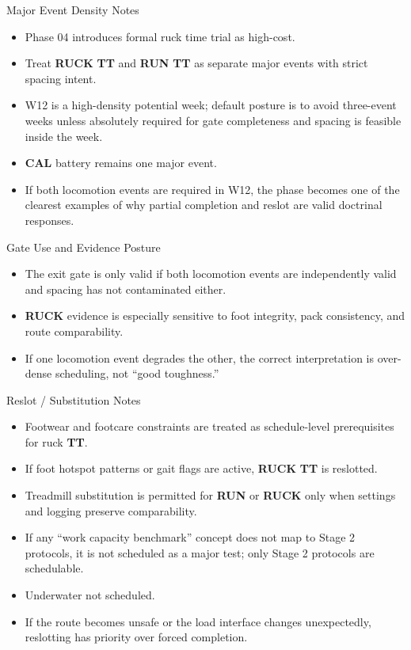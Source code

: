 \documentclass[10pt]{article}
\begin{document}
Major Event Density Notes

\begin{itemize}
\item Phase 04 introduces formal ruck time trial as high-cost.
\item Treat \textbf{RUCK} \textbf{TT} and \textbf{RUN} \textbf{TT} as separate major events with strict spacing intent.
\item W12 is a high-density potential week; default posture is to avoid three-event weeks unless absolutely required for gate completeness and spacing is feasible inside the week.
\item \textbf{CAL} battery remains one major event.
\item If both locomotion events are required in W12, the phase becomes one of the clearest examples of why partial completion and reslot are valid doctrinal responses.
\end{itemize}

Gate Use and Evidence Posture

\begin{itemize}
\item The exit gate is only valid if both locomotion events are independently valid and spacing has not contaminated either.
\item \textbf{RUCK} evidence is especially sensitive to foot integrity, pack consistency, and route comparability.
\item If one locomotion event degrades the other, the correct interpretation is over-dense scheduling, not “good toughness.”
\end{itemize}

Reslot / Substitution Notes

\begin{itemize}
\item Footwear and footcare constraints are treated as schedule-level prerequisites for ruck \textbf{TT}.
\item If foot hotspot patterns or gait flags are active, \textbf{RUCK} \textbf{TT} is reslotted.
\item Treadmill substitution is permitted for \textbf{RUN} or \textbf{RUCK} only when settings and logging preserve comparability.
\item If any “work capacity benchmark” concept does not map to Stage 2 protocols, it is not scheduled as a major test; only Stage 2 protocols are schedulable.
\item Underwater not scheduled.
\item If the route becomes unsafe or the load interface changes unexpectedly, reslotting has priority over forced completion.
\end{itemize}
\end{document}
